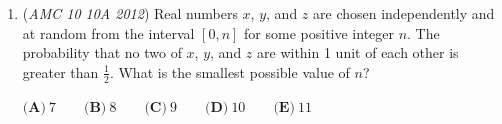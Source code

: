 \begin{enumerate}
 What is $a$?


 $\textbf{(A)}\ 249\qquad\textbf{(B)}\ 250\qquad\textbf{(C)}\ 251\qquad\textbf{(D)}\ 252\qquad\textbf{(E)}\ 253$


	\item (\textit{AMC 10 10A 2012}) Real numbers $x$, $y$, and $z$ are chosen independently and at random from the interval $[0,n]$ for some positive integer $n$. The probability that no two of $x$, $y$, and $z$ are within 1 unit of each other is greater than $\frac {1}{2}$. What is the smallest possible value of $n$?


 $\textbf{(A)}\ 7\qquad\textbf{(B)}\ 8\qquad\textbf{(C)}\ 9\qquad\textbf{(D)}\ 10\qquad\textbf{(E)}\ 11$


\end{enumerate}
